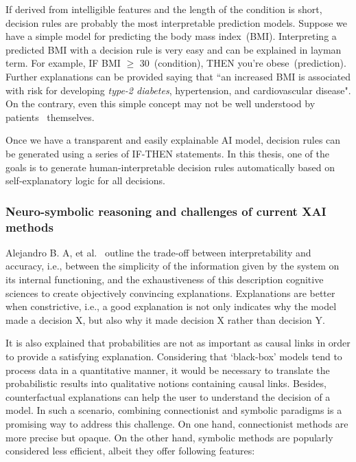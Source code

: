 \hspace*{3.5mm} If derived from intelligible features and the length of the condition is short, decision rules are probably the most interpretable prediction models. Suppose we have a simple model for predicting the body mass index~(BMI). Interpreting a predicted BMI with a decision rule is very easy and can be explained in layman term. For example, IF BMI $\geq$ 30~(condition), THEN you're obese~(prediction). Further explanations can be provided saying that ``an increased BMI is associated with risk for developing \textit{type-2 diabetes}, hypertension, and cardiovascular disease". On the contrary, even this simple concept may not be well understood by patients~\cite{post2015patient} themselves. 




Once we have a transparent and easily explainable AI model, decision rules can be generated using a series of IF-THEN statements. In this thesis, one of the goals is to generate human-interpretable decision rules automatically based on self-explanatory logic for all decisions. 

\subsubsection{Neuro-symbolic reasoning and challenges of current XAI methods}
Alejandro B. A, et al.~\cite{arrieta2020explainable} outline the trade-off between interpretability and accuracy, i.e., between the simplicity of the information given by the system on its internal functioning, and the exhaustiveness of this description
cognitive sciences to create objectively convincing explanations.
Explanations are better when constrictive, i.e., a good explanation is not only indicates why the model made a decision $\mathrm{X}$, but also why it made decision $\mathrm{X}$ rather than decision $\mathrm{Y}$. 

\hspace*{3.5mm}It is also explained that probabilities are not as important as causal links in order to provide a satisfying explanation. Considering that `black-box' models tend to process data in a quantitative manner, it would be necessary to translate the probabilistic results into qualitative notions containing causal links. Besides, counterfactual explanations can help the user to understand the decision of a model. In such a scenario, combining connectionist and symbolic paradigms is a promising way to address this challenge. On one hand, connectionist methods are more precise but opaque. On the other hand, symbolic methods are popularly considered less efficient, albeit they offer following features:


